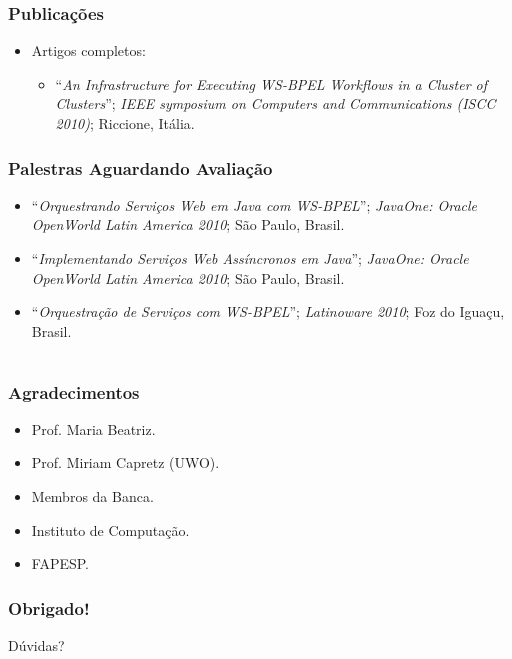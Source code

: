 \documentclass[red, cover=invisible, theme=Warsaw]{myslides}
\begin{document}
    \begin{frame} \frametitle{Publicações}
	\begin{itemize}
	    \item Artigos completos:
		\begin{itemize}
		    \item ``\textit{An Infrastructure for Executing WS-BPEL Workflows in a Cluster of Clusters}''; \textit{IEEE symposium on Computers and Communications (ISCC 2010)}; Riccione, Itália.
		\end{itemize}
	\end{itemize}
    \end{frame}   
    
    \begin{frame} \frametitle{Palestras Aguardando Avaliação}
	\begin{itemize}
	    \item ``\textit{Orquestrando Serviços Web em Java com WS-BPEL}''; \textit{JavaOne: Oracle OpenWorld Latin America 2010}; São Paulo, Brasil.
	    \item ``\textit{Implementando Serviços Web Assíncronos em Java}''; \textit{JavaOne: Oracle OpenWorld Latin America 2010}; São Paulo, Brasil.
	    \item ``\textit{Orquestração de Serviços com WS-BPEL}''; \textit{Latinoware 2010}; Foz do Iguaçu, Brasil.
	\end{itemize}
    \end{frame}



\section{}
\begin{frame}\frametitle{Agradecimentos}
\begin{itemize}
\item Prof. Maria Beatriz.
\item Prof. Miriam Capretz (UWO).
\item Membros da Banca.
\item Instituto de Computação.
\item FAPESP.
\end{itemize}
\end{frame}

\begin{frame}\frametitle{Obrigado!}
\begin{center}
{\Huge Dúvidas?}
\end{center}
\end{frame}
\end{document}
